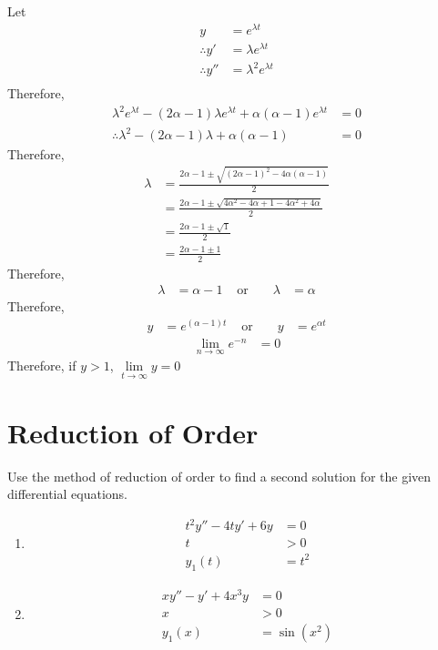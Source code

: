 \documentclass[fleqn, a4paper, 11pt, oneside]{amsart}
\theoremstyle{definition}
\theoremstyle{theorem}
\begin{document}
\begin{solution}
	Let
	\begin{align*}
		y              & = e^{\lambda t}           \\
		\therefore y'  & = \lambda e^{\lambda t}   \\
		\therefore y'' & = \lambda^2 e^{\lambda t} \\
	\end{align*}
	Therefore,
	\begin{align*}
		\lambda^2 e^{\lambda t} - (2 \alpha - 1) \lambda e^{\lambda t} + \alpha (\alpha - 1) e^{\lambda t} &= 0\\
		\therefore \lambda^2 - (2 \alpha - 1) \lambda + \alpha (\alpha - 1) &= 0
	\end{align*}
	Therefore,
	\begin{align*}
		\lambda &= \frac{2 \alpha - 1 \pm \sqrt{(2 \alpha - 1)^2 - 4 \alpha (\alpha - 1)}}{2}\\
		&= \frac{2 \alpha - 1 \pm \sqrt{4 \alpha^2 - 4 \alpha + 1 - 4 \alpha^2 + 4 \alpha}}{2}\\
		&= \frac{2 \alpha - 1 \pm \sqrt{1}}{2}\\
		&= \frac{2 \alpha - 1 \pm 1}{2}
	\end{align*}
	Therefore,
	\begin{align*}
		\lambda & = \alpha - 1 & \text{ or } &  & \lambda & = \alpha
	\end{align*}
	Therefore,
	\begin{align*}
		y & = e^{(\alpha - 1) t} & \text{ or } &  & y & = e^{\alpha t}
	\end{align*}
	\begin{align*}
		\lim\limits_{n \to \infty} e^{-n} &= 0
	\end{align*}
	Therefore, if $y > 1$, $\lim\limits_{t \to \infty} y = 0$
\end{solution}

\part{Reduction of Order}

\begin{question}
	Use the method of reduction of order to find a second solution for the given differential equations.
	\begin{enumerate}
		\item
			\begin{align*}
				t^2 y'' - 4 t y' + 6 y &= 0\\
				t &> 0\\
				y_1(t) &= t^2
			\end{align*}
		\item
			\begin{align*}
				x y'' - y' + 4 x^3 y &= 0\\
				x &> 0\\
				y_1(x) &= \sin(x^2)
			\end{align*}
	\end{enumerate}
\end{question}
\end{document}

